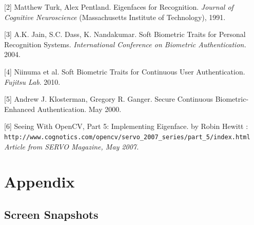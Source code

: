 \documentclass[12pt]{article}			%
\begin{document}
[2] Matthew Turk, Alex Pentland. Eigenfaces for Recognition. \textit {Journal of Cognitive Neuroscience} (Massachusetts Institute of Technology), 1991. 

[3] A.K. Jain, S.C. Dass, K. Nandakumar. Soft Biometric Traits for Personal Recognition Systems. \textit{ International Conference on Biometric Authentication.} 2004.
 
[4] Niinuma et al. Soft Biometric Traits for Continuous User Authentication. \textit{Fujitsu Lab}. 2010.

[5] Andrew J. Klosterman, Gregory R. Ganger. Secure Continuous Biometric-Enhanced Authentication. May 2000.

[6] Seeing With OpenCV, Part 5: Implementing Eigenface. by Robin Hewitt : \verb+http://www.cognotics.com/opencv/servo_2007_series/part_5/index.html+ \textit { Article from SERVO Magazine, May 2007. } 

\section{ Appendix }
\subsection{ Screen Snapshots}

\end{document}
